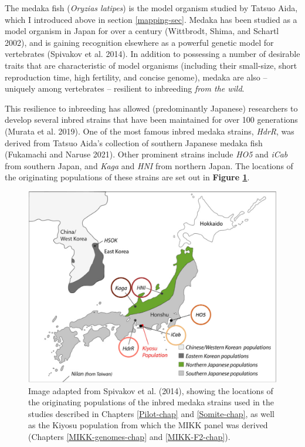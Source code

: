 \documentclass[
]{book}
\begin{document}
The medaka fish (\emph{Oryzias latipes}) is the model organism studied by Tatsuo Aida, which I introduced above in section \ref{mapping-sec}. Medaka has been studied as a model organism in Japan for over a century (Wittbrodt, Shima, and Schartl 2002), and is gaining recognition elsewhere as a powerful genetic model for vertebrates (Spivakov et al. 2014). In addition to possessing a number of desirable traits that are characteristic of model organisms (including their small-size, short reproduction time, high fertility, and concise genome), medaka are also -- uniquely among vertebrates -- resilient to inbreeding \emph{from the wild}.

This resilience to inbreeding has allowed (predominantly Japanese) researchers to develop several inbred strains that have been maintained for over 100 generations (Murata et al. 2019). One of the most famous inbred medaka strains, \emph{HdrR}, was derived from Tatsuo Aida's collection of southern Japanese medaka fish (Fukamachi and Naruse 2021). Other prominent strains include \emph{HO5} and \emph{iCab} from southern Japan, and \emph{Kaga} and \emph{HNI} from northern Japan. The locations of the originating populations of these strains are set out in \textbf{Figure \ref{fig:line-locations}}.



\begin{figure}

{\centering \includegraphics[width=1\linewidth]{figs/pilot/line_locations} 

}

\caption{Image adapted from Spivakov et al. (2014), showing the locations of the originating populations of the inbred medaka strains used in the studies described in Chapters \ref{Pilot-chap} and \ref{Somite-chap}, as well as the Kiyosu population from which the MIKK panel was derived (Chapters \ref{MIKK-genomes-chap} and \ref{MIKK-F2-chap}).}\label{fig:line-locations}
\end{figure}
\end{document}
